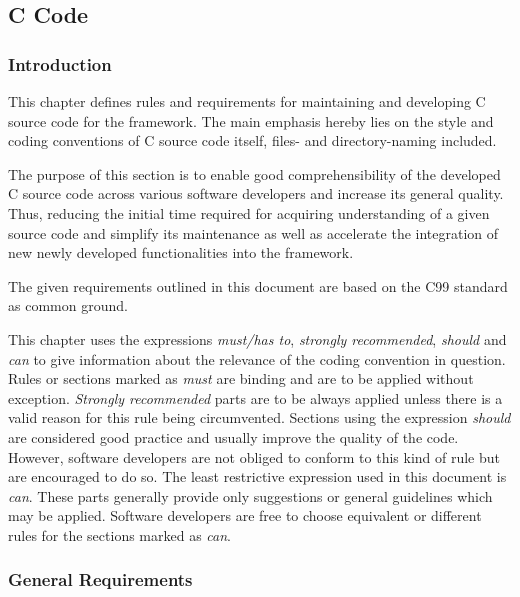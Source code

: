 

\subsection{C Code}


\subsubsection{Introduction}\label{C-Introduction}

This chapter defines rules and requirements for maintaining and developing C source code for the \asterics framework. The main emphasis hereby lies on the style and coding conventions of C source code itself, files- and directory-naming included.

The purpose of this section is to enable good comprehensibility of the developed C source code across various software developers and increase its general quality.
Thus, reducing the initial time required for acquiring understanding of a given source code and simplify its maintenance as well as accelerate the integration of new newly developed functionalities into the \asterics framework.

The given requirements outlined in this document are based on the C99 standard as common ground.

This chapter uses the expressions \textit{must/has to}, \textit{strongly recommended}, \textit{should} and \textit{can} to give information about the relevance of the coding convention in question.
Rules or sections marked as \textit{must} are binding and are to be applied without exception.
\textit{Strongly recommended} parts are to be always applied unless there is a valid reason for this rule being circumvented.
Sections using the expression \textit{should} are considered good practice and usually improve the quality of the code.
However, software developers are not obliged to conform to this kind of rule but are encouraged to do so.
The least restrictive expression used in this document is \textit{can}.
These parts generally provide only suggestions or general guidelines which may be applied.
Software developers are free to choose equivalent or different rules for the sections marked as \textit{can}. 


\subsubsection{General Requirements}\label{C-General-Requirements}

